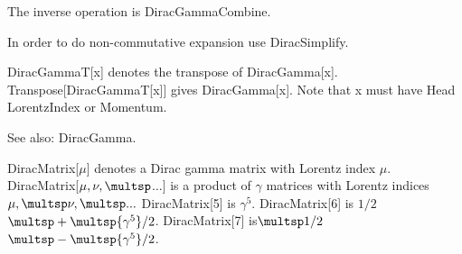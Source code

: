 The inverse operation is DiracGammaCombine.





In order to do non-commutative expansion use DiracSimplify.






DiracGammaT[x] denotes the transpose of DiracGamma[x]. Transpose[DiracGammaT[x]] gives DiracGamma[x]. Note that x must have Head
  LorentzIndex or Momentum.

See also:  DiracGamma.





\dispSFoutmath{
{{\gamma }^{\mu }}
}





DiracMatrix[\(\mu \)] denotes a Dirac gamma matrix with Lorentz index \(\mu \). DiracMatrix[\(\mu ,\nu ,\multsp \)...] is a product of \(\gamma \)
matrices with Lorentz indices \(\mu ,\multsp \nu ,\multsp ...\) DiracMatrix[5] is \({{\gamma }^5}\). DiracMatrix[6] is \(1/2\)\(\multsp +\multsp
{{\gamma }^5}/2\). DiracMatrix[7] is\(\multsp 1/2\)\(\multsp -\multsp {{\gamma }^5}/2\).

